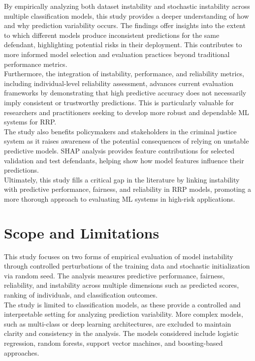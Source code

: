 \documentclass[12pt]{article}
\begin{document}
By empirically analyzing both dataset instability and stochastic instability across multiple classification models, this study provides a deeper understanding of how and why prediction variability occurs. The findings offer insights into the extent to which different models produce inconsistent predictions for the same defendant, highlighting potential risks in their deployment. This contributes to more informed model selection and evaluation practices beyond traditional performance metrics.\\

Furthermore, the integration of instability, performance, and reliability metrics, including individual-level reliability assessment, advances current evaluation frameworks by demonstrating that high predictive accuracy does not necessarily imply consistent or trustworthy predictions. This is particularly valuable for researchers and practitioners seeking to develop more robust and dependable ML systems for RRP.\\

The study also benefits policymakers and stakeholders in the criminal justice system as it raises awareness of the potential consequences of relying on unstable predictive models. SHAP analysis provides feature contributions for selected validation and test defendants, helping show how model features influence their predictions.\\

Ultimately, this study fills a critical gap in the literature by linking instability with predictive performance, fairness, and reliability in RRP models, promoting a more thorough approach to evaluating ML systems in high-risk applications.

\section{Scope and Limitations} 
\tabto{2em} This study focuses on two forms of empirical evaluation of model instability through controlled perturbations of the training data and stochastic initialization via random seed. The analysis measures predictive performance, fairness, reliability, and instability across multiple dimensions such as predicted scores, ranking of individuals, and classification outcomes.\\

The study is limited to classification models, as these provide a controlled and interpretable setting for analyzing prediction variability. More complex models, such as multi-class or deep learning architectures, are excluded to maintain clarity and consistency in the analysis. The models considered include logistic regression, random forests, support vector machines, and boosting-based approaches.\\
\end{document}
